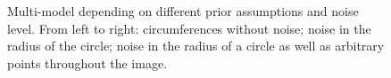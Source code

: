 \begin{figure}[h!]

\caption{Multi-model depending on different prior assumptions and noise level. From left to right: circumferences without noise; noise in the radius of the circle; noise in the radius of a circle as well as arbitrary points throughout the image.}
\label{ce:fig3}
\end{figure}

